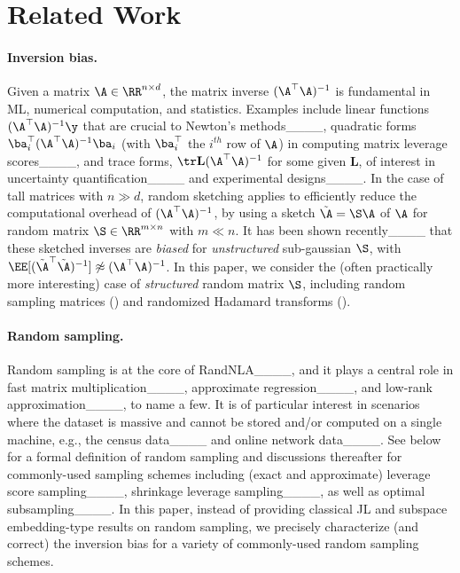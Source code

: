 \section{Related Work}
\label{subsec:related}



\paragraph{Inversion bias.}  
Given a matrix $\A \in \RR^{n \times d}$, the matrix inverse $(\A^\top\A)^{-1}$ is fundamental in ML, numerical computation, and statistics.  
Examples include linear functions $(\A^\top\A)^{-1}\y$ that are crucial to Newton's methods____, quadratic forms $\ba_i^\top(\A^\top\A)^{-1}\ba_i$ (with $\ba^\top_i$ the $i^{th}$ row of $\A$) in computing matrix leverage scores____, and trace forms, $\tr \mathbf{L} (\A^\top\A)^{-1} $ for some given $\mathbf{L}$, of interest in uncertainty quantification____ and experimental designs____.  
In the case of tall matrices with $n\gg d$, random sketching applies to efficiently reduce the computational overhead of $(\A^\top\A)^{-1}$, by using a sketch $\tilde\A=\S\A$ of $\A$ for random matrix $\S\in\RR^{m\times n}$ with $m\ll n$. 
It has been shown recently____ that these sketched inverses are \emph{biased} for \emph{unstructured} sub-gaussian $\S$, with $\EE[(\tilde \A^\top\tilde \A)^{-1}] \not \approx (\A^\top\A)^{-1}$. 
In this paper, we consider the (often practically more interesting) case of \emph{structured} random matrix $\S$, including random sampling matrices () and randomized Hadamard transforms ().


\paragraph{Random sampling.}
Random sampling is at the core of RandNLA____, and it plays a central role in fast matrix multiplication____, approximate regression____, and low-rank approximation____, to name a few. 
It is of particular interest in scenarios where the dataset is massive and cannot be stored and/or computed on a single machine, e.g., the census data____ and online network data____.
See  below for a formal definition of random sampling and discussions thereafter for commonly-used sampling schemes including (exact and approximate) leverage score sampling____, shrinkage leverage sampling____, as well as optimal subsampling____. 
In this paper, instead of providing classical JL and subspace embedding-type results on random sampling, we precisely characterize (and correct) the inversion bias for a variety of commonly-used random sampling schemes.
 


